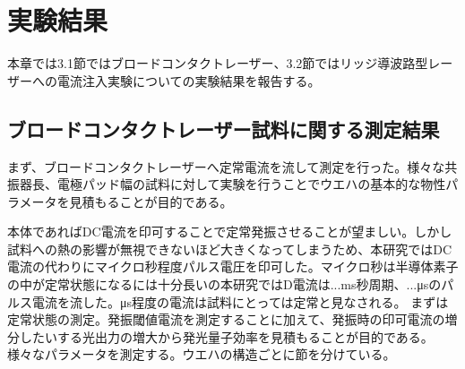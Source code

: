 
\chapter{実験結果}

本章では3.1節ではブロードコンタクトレーザー、3.2節ではリッジ導波路型レーザーへの電流注入実験についての実験結果を報告する。
\section{ブロードコンタクトレーザー試料に関する測定結果}%
まず、ブロードコンタクトレーザーへ定常電流を流して測定を行った。様々な共振器長、電極パッド幅の試料に対して実験を行うことでウエハの基本的な物性パラメータを見積もることが目的である。

本体であればDC電流を印可することで定常発振させることが望ましい。しかし試料への熱の影響が無視できないほど大きくなってしまうため、本研究ではDC電流の代わりにマイクロ秒程度パルス電圧を印可した。マイクロ秒は半導体素子の中が定常状態になるには十分長いの本研究ではD電流は...ms秒周期、...μsのパルス電流を流した。μs程度の電流は試料にとっては定常と見なされる。
まずは定常状態の測定。発振閾値電流を測定することに加えて、発振時の印可電流の増分したいする光出力の増大から発光量子効率を見積もることが目的である。
様々なパラメータを測定する。ウエハの構造ごとに節を分けている。
